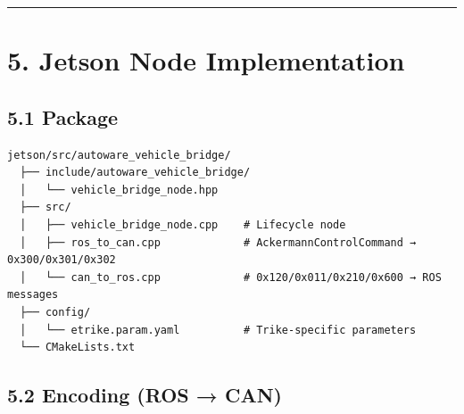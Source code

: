 \documentclass[12pt,a4paper,oneside]{report}
\begin{document}
\begin{center}\rule{0.5\linewidth}{0.5pt}\end{center}

\section{5. Jetson Node Implementation}\label{jetson-node-implementation}

\subsection{5.1 Package}\label{package}

\begin{verbatim}
jetson/src/autoware_vehicle_bridge/
  ├── include/autoware_vehicle_bridge/
  │   └── vehicle_bridge_node.hpp
  ├── src/
  │   ├── vehicle_bridge_node.cpp    # Lifecycle node
  │   ├── ros_to_can.cpp             # AckermannControlCommand → 0x300/0x301/0x302
  │   └── can_to_ros.cpp             # 0x120/0x011/0x210/0x600 → ROS messages
  ├── config/
  │   └── etrike.param.yaml          # Trike-specific parameters
  └── CMakeLists.txt
\end{verbatim}

\subsection{5.2 Encoding (ROS → CAN)}\label{encoding-ros-can}
\end{document}
